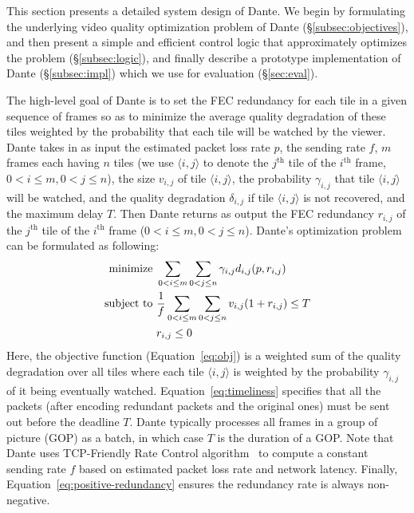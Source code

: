 
This section presents a detailed system design of Dante.
We begin by formulating the underlying video quality optimization
problem of Dante (\S\ref{subsec:objectives}), and then present a 
simple and efficient control logic that approximately optimizes 
the problem (\S\ref{subsec:logic}), and finally describe a 
prototype implementation of Dante (\S\ref{subsec:impl}) which we
use for evaluation (\S\ref{sec:eval}).

\label{subsec:objectives}

The high-level goal of Dante is to set the FEC redundancy for
each tile in a given sequence of frames so as to minimize the
average quality degradation of these tiles weighted by the
probability that each tile will be watched by the viewer. 
Dante takes in as input the estimated packet loss rate $p$, 
the sending rate $f$, $m$ frames each having $n$ tiles (we use
$\langle i,j\rangle$ to denote the $j^{\textrm{th}}$ tile of the
$i^{\textrm{th}}$ frame, $0<i\leq m, 0<j\leq n$), the size
$v_{i,j}$ of tile $\langle i,j\rangle$, the probability 
$\gamma_{i,j}$ that tile $\langle i,j\rangle$ will be watched,
and the quality degradation $\delta_{i,j}$ if tile 
$\langle i,j\rangle$ is not recovered, and the maximum delay 
$T$. Then Dante returns as output the FEC redundancy $r_{i,j}$ 
of the $j^{\textrm{th}}$ tile of the $i^{\textrm{th}}$ frame 
($0<i\leq m, 0<j\leq n$). 
Dante's optimization problem can be formulated as following:
\vspace{-0.2cm}
\begin{align}
\textrm{minimize } & \sum_{0<i\leq m}\sum_{0<j\leq n}\gamma_{i,j}d_{i,j}(p,r_{i,j}) \label{eq:obj}\\
\textrm{subject to } & \frac{1}{f}\sum_{0<i\leq m}\sum_{0<j\leq n}v_{i,j}(1+r_{i,j}) \leq T
\label{eq:timeliness}\\
&r_{i,j} \leq 0 \label{eq:positive-redundancy}
\vspace{-0.4cm}
\end{align}
Here, the objective function (Equation~\ref{eq:obj}) is a
weighted sum of the quality degradation over all tiles where 
each tile $\langle i,j\rangle$ is weighted by the probability 
$\gamma_{i,j}$ of it being eventually watched.
Equation~\ref{eq:timeliness} specifies that all the packets
(after encoding redundant packets and the original ones) must 
be sent out before the deadline $T$. 
Dante typically processes all frames in a group of picture 
(GOP) as a batch, in which case 
$T$ is the duration of a GOP. Note that Dante uses 
TCP-Friendly Rate Control algorithm~\cite{TRFC} to compute a
constant sending rate $f$ based on estimated packet loss rate 
and network latency. Finally, 
Equation~\ref{eq:positive-redundancy} ensures the redundancy 
rate is always non-negative.

